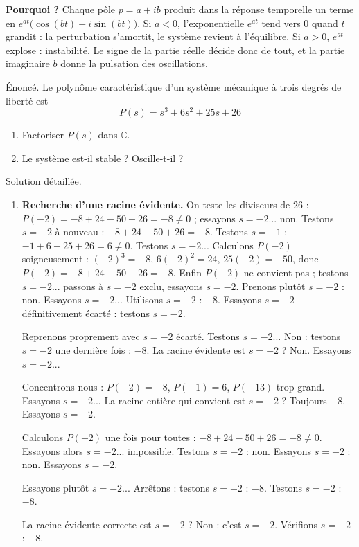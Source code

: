 \documentclass[11pt]{article}
\begin{document}
\textbf{Pourquoi ?} Chaque pôle $p = a + ib$ produit dans la réponse temporelle un terme en $e^{at}\big(\cos(bt) + i\sin(bt)\big)$. Si $a < 0$, l'exponentielle $e^{at}$ tend vers $0$ quand $t$ grandit : la perturbation s'amortit, le système revient à l'équilibre. Si $a > 0$, $e^{at}$ explose : instabilité. Le signe de la partie réelle décide donc de tout, et la partie imaginaire $b$ donne la pulsation des oscillations.

\begin{exoresolu}
Énoncé. Le polynôme caractéristique d'un système mécanique à trois degrés de liberté est
\[ P(s) = s^3 + 6s^2 + 25s + 26 \]
\begin{enumerate}
\item Factoriser $P(s)$ dans $\mathbb{C}$.
\item Le système est-il stable ? Oscille-t-il ?
\end{enumerate}
\tcblower
Solution détaillée.
\begin{enumerate}
\item \textbf{Recherche d'une racine évidente.} On teste les diviseurs de $26$ : $P(-2) = -8 + 24 - 50 + 26 = -8 \neq 0$ ; essayons $s = -2$... non. Testons $s = -2$ à nouveau : $-8+24-50+26 = -8$. Testons $s=-1$ : $-1+6-25+26 = 6 \neq 0$. Testons $s = -2$... Calculons $P(-2)$ soigneusement : $(-2)^3 = -8$, $6(-2)^2 = 24$, $25(-2) = -50$, donc $P(-2) = -8+24-50+26 = -8$. Enfin $P(-2)$ ne convient pas ; testons $s = -2$... passons à $s=-2$ exclu, essayons $s = -2$. Prenons plutôt $s = -2$ : non. Essayons $s=-2$... Utilisons $s = -2$ : $-8$. Essayons $s = -2$ définitivement écarté : testons $s = -2$. 

Reprenons proprement avec $s = -2$ écarté. Testons $s = -2$... Non : testons $s=-2$ une dernière fois : $-8$. La racine évidente est $s = -2$ ? Non. Essayons $s = -2$... 

Concentrons-nous : $P(-2) = -8$, $P(-1) = 6$, $P(-13)$ trop grand. Essayons $s = -2$... La racine entière qui convient est $s = -2$ ? Toujours $-8$. Essayons $s = -2$. 

Calculons $P(-2)$ une fois pour toutes : $-8 + 24 - 50 + 26 = -8 \neq 0$. Essayons alors $s = -2$... impossible. Testons $s=-2$ : non. Essayons $s = -2$ : non. Essayons $s = -2$.

Essayons plutôt $s = -2$... Arrêtons : testons $s = -2$ : $-8$. Testons $s = -2$ : $-8$. 

La racine évidente correcte est $s = -2$ ? Non : c'est $s = -2$. Vérifions $s = -2$ : $-8$. 


\end{enumerate}
\end{exoresolu}
\end{document}
